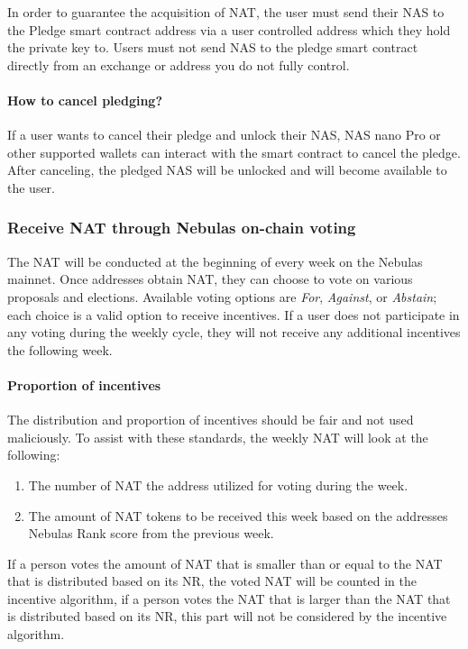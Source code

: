In order to guarantee the acquisition of NAT, the user must send their NAS to the Pledge smart contract address via a user controlled address which they hold the private key to. Users must not send NAS to the pledge smart contract directly from an exchange or address you do not fully control.


\paragraph{How to cancel pledging?}

If a user wants to cancel their pledge and unlock their NAS, NAS nano Pro or other supported wallets can interact with the smart contract to cancel the pledge. After canceling, the pledged NAS will be unlocked and will become available to the user.

\subsubsection{Receive NAT through Nebulas on-chain voting}

The NAT will be conducted at the beginning of every week on the Nebulas
mainnet. Once addresses obtain NAT, they can choose to vote on various
proposals and elections. Available voting options are \textit{For}, \textit{Against}, or
\textit{Abstain}; each choice is a valid option to receive incentives. If a user does not participate in any voting during the weekly cycle, they will not receive any additional incentives the following week.


\paragraph{Proportion of incentives}

The distribution and proportion of incentives should be fair and not used maliciously. To assist with these standards, the weekly NAT will look at the following:

\begin{enumerate}
	\item The number of NAT the address utilized for voting during the week.
	\item The amount of NAT tokens to be received this week based on the addresses Nebulas Rank score from the previous week.
\end{enumerate}

If a person votes the amount of NAT that is smaller than or equal to the NAT that is distributed based on its NR, the voted NAT will be counted in the incentive algorithm, if a person votes the NAT that is larger than the NAT that is distributed based on its NR, this part will not be considered by the incentive algorithm. 

